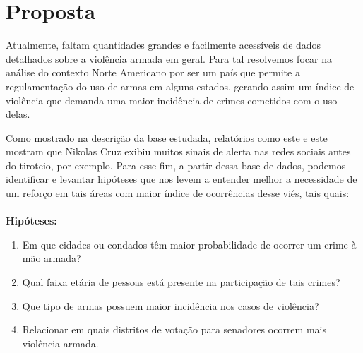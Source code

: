 \section{
Proposta} 
\par
Atualmente, faltam quantidades grandes e facilmente acessíveis de dados detalhados sobre a violência armada em geral. 
Para tal resolvemos focar na análise do contexto Norte Americano por ser um país que permite a regulamentação do uso de armas em alguns estados, gerando assim um índice de violência que demanda uma maior incidência de crimes cometidos com o uso delas. 
\par
Como mostrado na descrição da base estudada, relatórios como este e este mostram que Nikolas Cruz exibiu muitos sinais de alerta nas redes sociais antes do tiroteio, por exemplo. 
Para esse fim, a partir dessa base de dados, podemos identificar e levantar hipóteses que nos levem a entender melhor a necessidade de um reforço em tais áreas com maior índice de ocorrências desse viés, tais quais:
\\
\\
\textbf{Hipóteses:}

\begin{enumerate}
\item Em que cidades ou condados têm maior probabilidade de ocorrer um crime à mão armada?
\item Qual faixa etária de pessoas está presente na participação de tais crimes?
\item Que tipo de armas possuem maior incidência nos casos de violência?
\item Relacionar em quais  distritos de votação para senadores ocorrem mais violência armada.
\end{enumerate}
